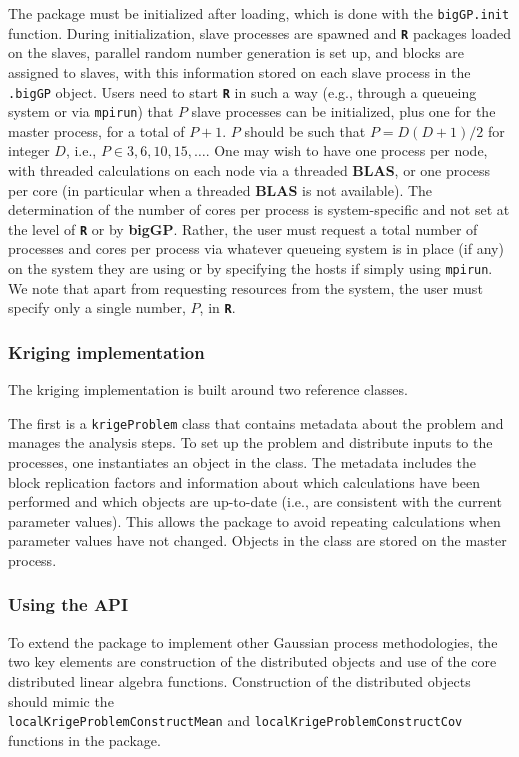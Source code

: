 \documentclass[12pt]{article}
\newcommand{\proglang}[1]{\textbf{\texttt{#1}}}
\newcommand{\pkg}[1]{\textbf{#1}}
\newcommand{\code}[1]{\texttt{#1}}
\begin{document}
The package must be initialized after loading, which is done with the
\code{bigGP.init} function. During initialization, slave processes are
spawned and \proglang{R} packages loaded on the slaves, parallel
random number generation is set up, and blocks are assigned to slaves,
with this information stored on each slave process in the
\code{.bigGP} object. Users need to start \proglang{R} in such a way
(e.g., through a queueing system or via \code{mpirun}) that $P$ slave
processes can be initialized, plus one for the master process, for a
total of $P+1$. $P$ should be such that $P = D(D+1)/2$ for integer
$D$, i.e., $P \in {3,6,10,15,\ldots}$. One may wish to have one
process per node, with threaded calculations on each node via a
threaded \pkg{BLAS}, or one process per core (in particular when a
threaded \pkg{BLAS} is not available). The determination of the number
of cores per process is system-specific and not set at the level of \proglang{R}
or by \pkg{bigGP}. Rather, the user must request a total number of
processes and cores per process via whatever queueing system is in
place (if any) on the system they are using or by specifying the hosts
if simply using \code{mpirun}.  We note that apart from requesting
resources from the system, the user must specify only a single number,
$P$, in \proglang{R}.


\subsubsection{Kriging implementation}

The kriging implementation is built around two reference classes. 

The first is a \code{krigeProblem} class that contains metadata about the problem and manages the analysis steps. To set up the problem and distribute inputs to the processes, one instantiates an object in the class. The metadata includes the block replication factors and information about which calculations have been performed and which objects are  up-to-date (i.e., are consistent with the current parameter values). This allows the package to avoid repeating calculations when parameter values have not changed. Objects in the class are stored on the master process. 


\subsubsection{Using the API}

To extend the package to implement other Gaussian process methodologies, the two key elements are construction of the distributed objects and use of the core distributed linear algebra functions. Construction of the distributed objects should mimic the\\\code{localKrigeProblemConstructMean} and \code{localKrigeProblemConstructCov} functions in the package. 
\end{document}

